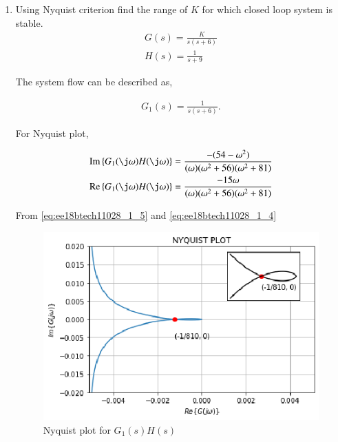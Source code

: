 \begin{enumerate}[label=\thesection.\arabic*.,ref=\thesection.\theenumi]
\item Using Nyquist criterion find the range of $K$ for which closed loop system is stable.
\begin{align}
    G(s) = \frac{K}{s(s+6)}
    \label{eq:ee18btech11028_1_1}
\\
    H(s) = \frac{1}{s+9}
    \label{eq:ee18btech11028_1_2}
\end{align}

\solution
The system flow can be described as,

\begin{figure}[!ht]
    \begin{center}
        \resizebox{\columnwidth}{!}{}
    \end{center}
    \caption{}  
    \label{fig:ee18btech11028_1_fig1}
\end{figure}


\begin{align}
    G_{1}(s) = \frac{1}{s(s+6)}. 
    \label{eq:ee18btech11028_1_3}
\end{align}

For Nyquist plot, 

\begin{align}
    \text{Im} \cbrak{G_{1}(\j \omega)H(\j \omega)} &= \frac{-(54 - \omega^{2})}{(\omega)(\omega^{2}+56)(\omega^{2} + 81)}
    \label{eq:ee18btech11028_1_5}
\\
    \text{Re} \cbrak{G_{1}(\j \omega)H(\j \omega)} &= \frac{-15 \omega}{(\omega)(\omega^{2}+56)(\omega^{2} + 81)}
    \label{eq:ee18btech11028_1_4}
\end{align}

From \eqref{eq:ee18btech11028_1_5} and \eqref{eq:ee18btech11028_1_4}

\begin{figure}[!h]
\includegraphics[width=\columnwidth]{./figs/ee18btech11028_1.eps}
    \centering
  \caption{Nyquist plot for $G_{1}(s)H(s)$}
  \label{fig:ee18btech11028_1_fig2}
\end{figure}



\end{enumerate}
